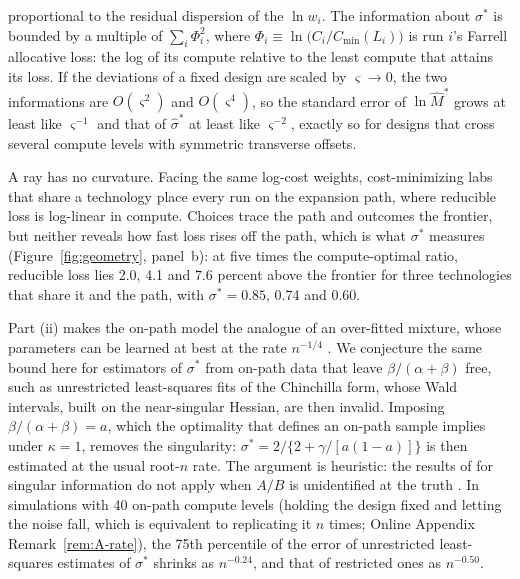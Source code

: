 \begin{proposition}
\begin{enumerate}
proportional to the residual dispersion of the $\ln w_i$. The
information about $\sigma^*$ is bounded by a multiple of $\sum_i\Phi_i^2$, where $\Phi_i\equiv\ln\big(C_i/C_{\min}(L_i)\big)$
is run $i$'s Farrell allocative loss: the log of its compute relative to the least compute that attains its loss. If the
deviations of a fixed design are scaled by $\varsigma\to0$, the two informations are $O(\varsigma^2)$ and
$O(\varsigma^4)$, so the standard error of $\ln\hat M^*$ grows at least like $\varsigma^{-1}$ and that of $\hat\sigma^*$ at
least like $\varsigma^{-2}$, exactly so for designs that cross several compute levels with symmetric transverse
offsets.
\end{enumerate}
\end{proposition}

A ray has no curvature. Facing the same log-cost weights, cost-minimizing labs that share a technology place every run
on the expansion path, where reducible loss is log-linear in compute. Choices trace the path
and outcomes the frontier, but neither reveals how fast loss rises off the path, which is what $\sigma^*$ measures
(Figure~\ref{fig:geometry}, panel~b): at five times the compute-optimal ratio, reducible loss lies 2.0, 4.1 and 7.6
percent above the frontier for three technologies that share it and the path, with $\sigma^*=0.85$, 0.74 and 0.60.



\begin{remark}\label{rem:rate}
Part (ii) makes the on-path model the analogue of an over-fitted mixture, whose parameters can be learned at best at the
rate $n^{-1/4}$ \citep{chen1995optimal}. We conjecture the same bound here for estimators of $\sigma^*$ from on-path data
that leave $\beta/(\alpha+\beta)$ free, such as unrestricted least-squares fits of the Chinchilla form, whose Wald
intervals, built on the near-singular Hessian, are then invalid. Imposing $\beta/(\alpha+\beta)=a$, which the optimality that defines an on-path sample
implies under $\kappa=1$, removes the singularity: $\sigma^*=2/\{2+\gamma/[a(1-a)]\}$ is then estimated at the usual
root-$n$ rate. The argument is heuristic: the results of
\citet{rotnitzky2000likelihood} for singular information do not apply when $A/B$ is unidentified at the truth
\citep[see also][]{sargan1983identification}. In simulations with 40 on-path compute levels (holding the design fixed and letting the noise
fall, which is equivalent to replicating it $n$ times; Online Appendix Remark~\ref{rem:A-rate}), the 75th percentile of
the error of unrestricted least-squares estimates of $\sigma^*$ shrinks as $n^{-0.24}$, and that of restricted ones as
$n^{-0.50}$.
\end{remark}

